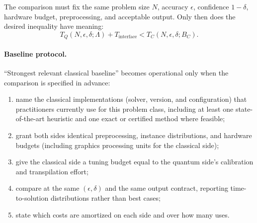 The comparison must fix the same problem size $N$, accuracy $\epsilon$, confidence $1-\delta$, hardware budget, preprocessing, and acceptable output. Only then does the desired inequality have meaning:
\begin{equation}
T_Q(N,\epsilon,\delta;\Lambda)+T_{\mathrm{interface}}
<T_C(N,\epsilon,\delta;B_C).
\label{eq:crossover}
\end{equation}

\paragraph{Baseline protocol.} ``Strongest relevant classical baseline'' becomes operational only when the comparison is specified in advance:
\begin{enumerate}
  \item name the classical implementations (solver, version, and configuration) that practitioners currently use for this problem class, including at least one state-of-the-art heuristic and one exact or certified method where feasible;
  \item grant both sides identical preprocessing, instance distributions, and hardware budgets (including graphics processing units for the classical side);
  \item give the classical side a tuning budget equal to the quantum side's calibration and transpilation effort;
  \item compare at the same $(\epsilon,\delta)$ and the same output contract, reporting time-to-solution distributions rather than best cases;
  \item state which costs are amortized on each side and over how many uses.
\end{enumerate}
